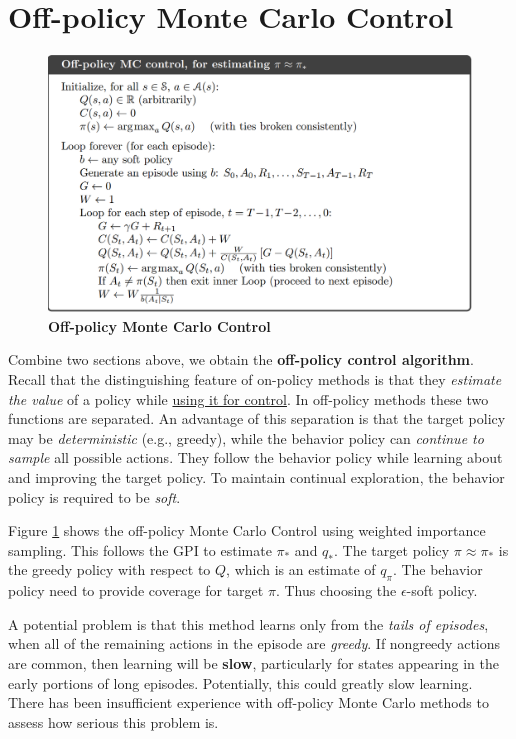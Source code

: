 \documentclass[11pt]{article}
\begin{document}
\section{Off-policy Monte Carlo Control}
\begin{figure}
\begin{minipage}[t]{1\linewidth}
  \centering
  \centerline{\includegraphics[scale = 0.3]{off_policy_mc_control.png}}
\end{minipage}
\caption{\footnotesize{\textbf{Off-policy Monte Carlo Control}}}
\label{fig: off_policy_mc_control}
\end{figure}

Combine two sections above, we obtain the \textbf{off-policy control algorithm}. Recall that the distinguishing feature of on-policy methods is that they \emph{estimate the value} of a policy while \underline{using it for control}. In off-policy methods these two functions are separated. An advantage of this separation is that the target policy may be \emph{deterministic} (e.g., greedy), while the behavior policy can \emph{continue to sample} all possible actions. They follow the behavior policy while learning about and
improving the target policy. To maintain continual exploration, the behavior policy is required to be \emph{soft}. 

Figure \ref{fig: off_policy_mc_control} shows the off-policy Monte Carlo Control using weighted importance sampling. This follows the GPI to estimate $\pi_{*}$ and $q_{*}$. The target policy $\pi \approx \pi_{*}$ is the greedy policy with respect to $Q$, which is an estimate of $q_{\pi}$. The behavior policy need to provide coverage for target $\pi$. Thus choosing the $\epsilon$-soft policy.

A potential problem is that this method learns only from the \emph{tails of episodes}, when all of the remaining actions in the episode are \emph{greedy}. If nongreedy actions are common, then learning will be \textbf{slow}, particularly for states appearing in the early portions of long episodes. Potentially, this could greatly slow learning. There has been insufficient experience with off-policy Monte Carlo methods to assess how serious this problem is. 

\newpage


\end{document}
